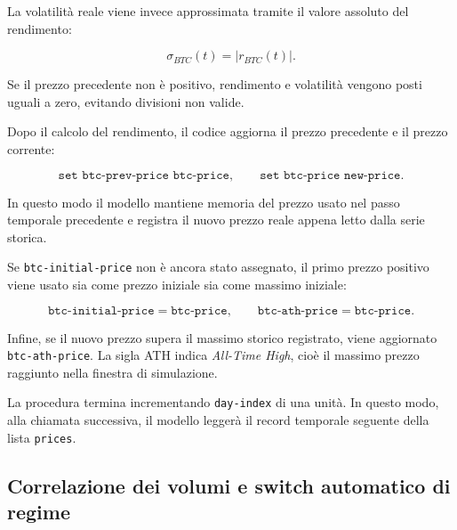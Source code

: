La volatilità reale viene invece approssimata tramite il valore assoluto del
rendimento:

\[
\sigma_{BTC}(t)=|r_{BTC}(t)|.
\]

Se il prezzo precedente non è positivo, rendimento e volatilità vengono posti
uguali a zero, evitando divisioni non valide.

Dopo il calcolo del rendimento, il codice aggiorna il prezzo precedente e il
prezzo corrente:

\[
\texttt{set btc-prev-price btc-price},
\qquad
\texttt{set btc-price new-price}.
\]

In questo modo il modello mantiene memoria del prezzo usato nel passo temporale
precedente e registra il nuovo prezzo reale appena letto dalla serie storica.

Se \texttt{btc-initial-price} non è ancora stato assegnato, il primo prezzo
positivo viene usato sia come prezzo iniziale sia come massimo iniziale:

\[
\texttt{btc-initial-price} = \texttt{btc-price},
\qquad
\texttt{btc-ath-price} = \texttt{btc-price}.
\]

Infine, se il nuovo prezzo supera il massimo storico registrato, viene aggiornato
\texttt{btc-ath-price}. La sigla ATH indica \emph{All-Time High}, cioè il massimo
prezzo raggiunto nella finestra di simulazione.

La procedura termina incrementando \texttt{day-index} di una unità. In questo
modo, alla chiamata successiva, il modello leggerà il record temporale seguente
della lista \texttt{prices}.

\subsection{Correlazione dei volumi e switch automatico di regime}

